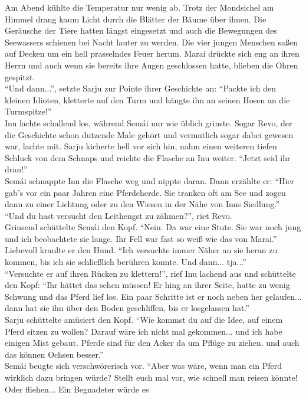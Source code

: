 Am Abend kühlte die Temperatur nur wenig ab. Trotz der Mondsichel am Himmel drang kaum Licht durch 
die Blätter der Bäume über ihnen. Die Geräusche der Tiere hatten längst eingesetzt und auch die 
Bewegungen des Seewassers schienen bei Nacht lauter zu werden. Die vier jungen Menschen saßen auf 
Decken um ein hell prasselndes Feuer herum. Marai drückte sich eng an ihren Herrn und auch wenn sie 
bereits ihre Augen geschlossen hatte, blieben die Ohren gespitzt. \\
``Und dann...'', setzte Sarju zur Pointe ihrer Geschichte an: ``Packte ich den kleinen Idioten, 
kletterte auf den Turm und hängte ihn an seinen Hosen an die Turmspitze!''\\
Inu lachte schallend los, während Semái nur wie üblich grinste. Sogar Revo, der die Geschichte schon 
dutzende Male gehört und vermutlich sogar dabei gewesen war, lachte mit. Sarju kicherte hell vor 
sich hin, nahm einen weiteren tiefen Schluck von dem Schnaps und reichte die Flasche an Inu 
weiter. ``Jetzt seid ihr dran!''\\
Semái schnappte Inu die Flasche weg und nippte daran. Dann erzählte er: ``Hier gab's vor ein paar 
Jahren eine Pferdeherde. Sie tranken oft am See und zogen dann zu einer Lichtung oder zu den 
Wiesen in der Nähe von Inus Siedlung.''\\
``Und du hast versucht den Leithengst zu zähmen?'', riet Revo.\\
Grinsend schüttelte Semái den Kopf. ``Nein. Da war eine Stute. Sie war noch jung und ich 
beobachtete sie lange. Ihr Fell war fast so weiß wie das von Marai.'' Liebevoll kraulte er den 
Hund. ``Ich versuchte immer Näher an sie heran zu kommen, bis ich sie schließlich berühren konnte. 
Und dann... tja...''\\
``Versuchte er auf ihren Rücken zu klettern!'', rief Inu lachend aus und schüttelte den Kopf: ``Ihr 
hättet das sehen müssen! Er hing an ihrer Seite, hatte zu wenig Schwung und das Pferd lief los. Ein 
paar Schritte ist er noch neben her gelaufen... dann hat sie ihn über den Boden geschliffen, bis er 
losgelassen hat.''\\
Sarju schüttelte amüsiert den Kopf. ``Wie kommst du auf die Idee, auf einem Pferd sitzen zu wollen? 
Darauf wäre ich nicht mal gekommen... und ich habe einigen Mist gebaut. Pferde sind für den Acker 
da um Pflüge zu ziehen. und auch das können Ochsen besser.''\\
Semái beugte sich verschwörerisch vor. ``Aber was wäre, wenn man ein Pferd wirklich dazu bringen 
würde? Stellt euch mal vor, wie schnell man reisen könnte! Oder fliehen... Ein Begnadeter würde es 

